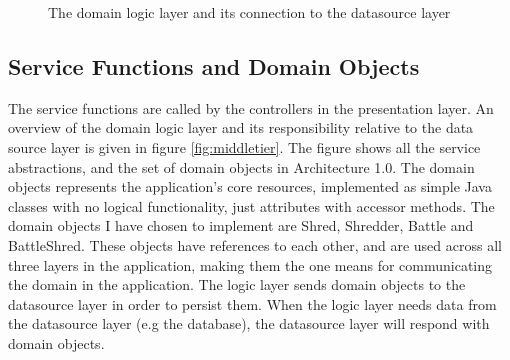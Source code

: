 \begin{figure}
		  \begin{center}
		\end{center}
		\caption{The domain logic layer and its connection to the datasource layer}\label{fig:middletier}
\end{figure}

\subsection{Service Functions and Domain Objects} 
The service functions are called by the controllers in the presentation layer. An overview of the domain logic layer and its responsibility relative to the data source layer is given in figure \vref{fig:middletier}. The figure shows all the service abstractions, and the set of domain objects in Architecture 1.0. The domain objects represents the application's core resources, implemented as simple Java classes with no logical functionality, just attributes with accessor methods. The domain objects I have chosen to implement are Shred, Shredder, Battle and BattleShred. These objects have references to each other, and are used across all three layers in the application, making them the one means for communicating the domain in the application. The logic layer sends domain objects to the datasource layer in order to persist them. When the logic layer needs data from the datasource layer (e.g the database), the datasource layer will respond with domain objects.

